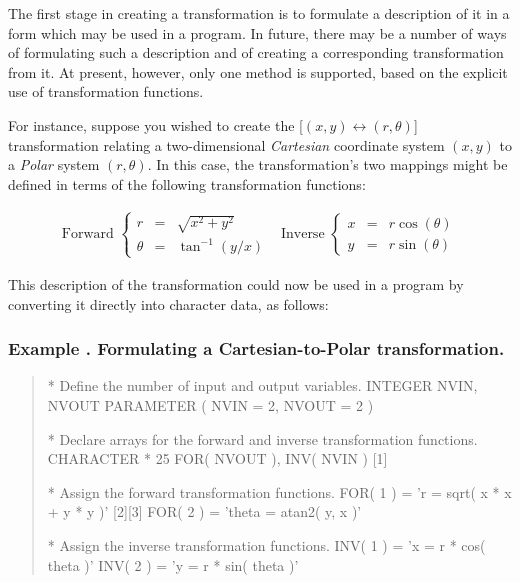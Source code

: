 \documentclass[twoside,nolof,11pt]{starlink}
\newcounter{examplecounter}
\providecommand{\example}[1]{\addtocounter{examplecounter}{1}
                         \subsubsection*{Example \theexamplecounter. #1}}
\begin{document}
The first stage in creating a transformation is to formulate a description
of it in a form which may be used in a program.
In future, there may be a number of ways of formulating such a description
and of creating a corresponding transformation from it.
At present, however, only one method is supported, based on the explicit use
of transformation functions.

For instance, suppose you wished to create the \mbox{[$(x,y) \leftrightarrow
(r,\theta)$]} transformation relating a two-dimensional \emph{Cartesian}
coordinate system \mbox{$(x,y)$} to a \emph{Polar} system
\mbox{$(r,\theta)$}.
In this case, the transformation's two mappings might be defined in terms of
the following transformation functions:

\begin{equation}
\begin{array}{cc}
\mbox{Forward } \left\{
\begin{array}{lll}
r & = & \sqrt{x^2+y^2} \\
\theta & = & \tan^{-1} \left( {y/x} \right)
\end{array}
\right.
&
\mbox{Inverse } \left\{
\begin{array}{lll}
x & = & r \cos( \theta ) \\
y & = & r \sin( \theta )
\end{array}
\right.
\end{array}
\label{equation:polar}
\end{equation}

This description of the transformation could now be used in a program by
converting it directly into character data, as follows:

\example{Formulating a Cartesian-to-Polar transformation.}
\begin{quote}
\begin{terminalv}
*  Define the number of input and output variables.
      INTEGER NVIN, NVOUT
      PARAMETER ( NVIN = 2, NVOUT = 2 )

*  Declare arrays for the forward and inverse transformation functions.
      CHARACTER * 25  FOR( NVOUT ), INV( NVIN )        [1]

*  Assign the forward transformation functions.
      FOR( 1 ) = 'r = sqrt( x * x + y * y )'           [2][3]
      FOR( 2 ) = 'theta = atan2( y, x )'

*  Assign the inverse transformation functions.
      INV( 1 ) = 'x = r * cos( theta )'
      INV( 2 ) = 'y = r * sin( theta )'

\end{terminalv}
\end{quote}
\end{document}
